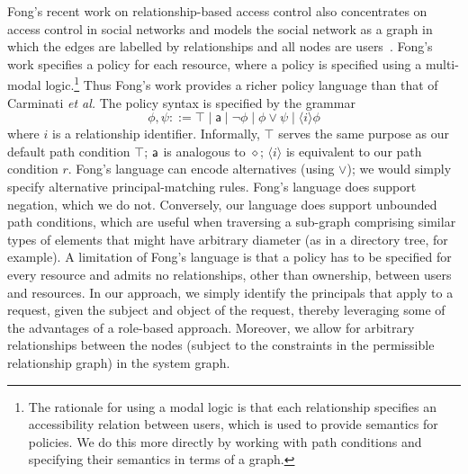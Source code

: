 \documentclass{article}
\begin{document}
Fong's recent work on relationship-based access control also concentrates on access control in social networks and models the social network as a graph in which the edges are labelled by relationships and all nodes are users~\cite{Fong_ReBAC,Fong_ESORICS09}.
Fong's work specifies a policy for each resource, where a policy is specified using a multi-modal logic.\footnote{The rationale for using a modal logic is that each relationship specifies an accessibility relation between users, which is used to provide semantics for policies.  We do this more directly by working with path conditions and specifying their semantics in terms of a graph.}
Thus Fong's work provides a richer policy language than that of Carminati {\em et al.}
The policy syntax is specified by the grammar \[  \phi, \psi ::= \top \mid \textsf{a} \mid \neg \phi \mid \phi \vee \psi \mid \langle i \rangle \phi \] where $i$ is a relationship identifier.
Informally, $\top$ serves the same purpose as our default path condition $\top$; $\sf a$ is analogous to $\diamond$; $\langle i \rangle$ is equivalent to our path condition $r$.
Fong's language can encode alternatives (using $\vee$); we would simply specify alternative principal-matching rules.
Fong's language does support negation, which we do not.
Conversely, our language does support unbounded path conditions, which are useful when traversing a sub-graph comprising similar types of elements that might have arbitrary diameter (as in a directory tree, for example).
A limitation of Fong's language is that a policy has to be specified for every resource and admits no relationships, other than ownership, between users and resources.
In our approach, we simply identify the principals that apply to a request, given the subject and object of the request, thereby leveraging some of the advantages of a role-based approach.
Moreover, we allow for arbitrary relationships between the nodes (subject to the constraints in the permissible relationship graph) in the system graph.
\end{document}
